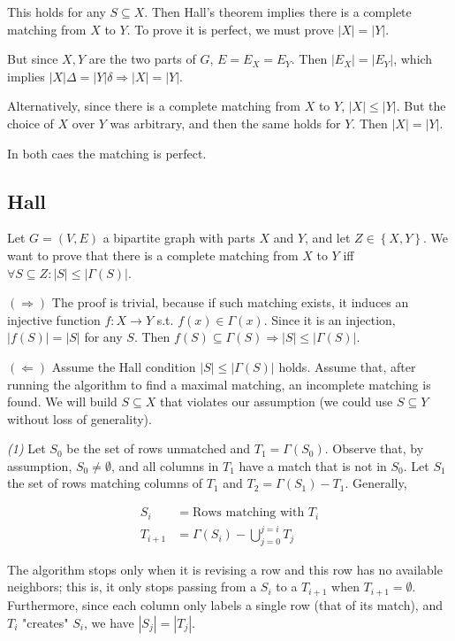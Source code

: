 This holds for any $S \subseteq X$. Then Hall's theorem implies there is a
complete matching from $X$ to $Y$. To prove it is perfect, we must prove $|X| =
|Y|$.

But since $X, Y$ are the two parts of $G$, $E = E_X = E_Y$. Then $|E_X| =
|E_Y|$, which implies $|X| \Delta = |Y| \delta \Rightarrow |X| =
|Y|$.

Alternatively, since there is a complete matching from $X$ to $Y$, $|X| \leq
|Y|$. But the choice of $X$ over $Y$ was arbitrary, and then the same holds for
$Y$. Then $|X| = |Y|$.

In both caes the matching is perfect.



\pagebreak 

\subsection{Hall}

Let $G = (V, E)$ a bipartite graph with parts $X$ and $Y$, and let $Z \in
\left\{ X, Y \right\} $. We want to prove that there is a complete matching
from $X$ to $Y$ iff $\forall S \subseteq Z : |S| \leq |\Gamma(S)| $.

$(\Rightarrow)$ The proof is trivial, because if such matching exists, it
induces an injective function $f : X \to Y$ s.t. $f(x) \in \Gamma(x)$. Since it
is an injection, $|f(S)| = |S|$ for any $S$. Then $f(S) \subseteq \Gamma(S)
\Rightarrow |S| \leq |\Gamma(S)|$.

$(\Leftarrow)$ Assume the Hall condition $|S| \leq |\Gamma(S)|$ holds. Assume
that, after running the algorithm to find a maximal matching, an incomplete
matching is found. We will build $S \subseteq X$ that violates our assumption
(we could use $S \subseteq Y$ without loss of generality).

\textit{(1)} Let $S_0$ be the set of rows unmatched and $T_1 = \Gamma(S_0)$.
Observe that, by assumption, $S_0 \neq \emptyset$, and all columns in $T_1$
have a match that is not in $S_0$. Let $S_1$ the set of rows matching columns
of $T_1$ and $T_2 = \Gamma(S_1) - T_1$. Generally, 

\begin{align*}
    S_i &= \text{Rows matching with } T_i \\ 
    T_{i+1} &= \Gamma(S_i) - \bigcup^{j=i}_{j=0} T_j
\end{align*}

The algorithm stops only when it is revising a row and this row has no
available neighbors; this is, it only stops passing from a $S_i$ to a $T_{i+1}$
when $T_{i+1} = \emptyset$. Furthermore, since each column only labels a single
row (that of its match), and $T_i$ "creates" $S_i$, we have $|S_j| = |T_j|$. 

